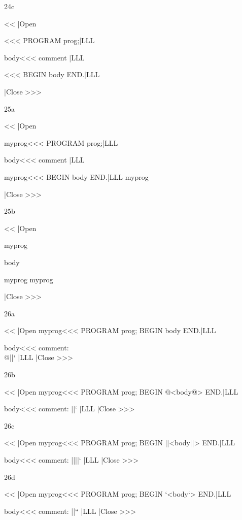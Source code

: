 {2{4c}

\<<<
|Open

\<\><<<
PROGRAM prog;|LLL

\<body\><<<
{ comment } |LLL

\<\><<<
BEGIN
  \<body\>
END.|LLL

\OutputCode\<\> 
|Close >>>  



2{5a}

\<<<
|Open

\<myprog\><<<
PROGRAM prog;|LLL

\<body\><<<
{ comment } |LLL

\<myprog\><<<
BEGIN
  \<body\>
END.|LLL
\OutputCode\<myprog\> 

|Close >>>

2{5b}

\<<<
|Open

\<myprog

\<body

\<myprog
\OutputCode\<myprog\>  

|Close >>>




2{6a}

\<<<
|Open
\<myprog\><<<
PROGRAM prog;
BEGIN
  \<body\>
END.|LLL  

\<body\><<<
{ comment: \\@||` } |LLL 
|Close >>> 

2{6b}

\<<<
|Open
\<myprog\><<<
PROGRAM prog;
BEGIN
  @<body@>
END.|LLL  

\<body\><<<
{ comment: \@@||` } |LLL 
|Close >>> 

2{6c}


\<<<
|Open
\<myprog\><<<
PROGRAM prog;
BEGIN
  ||<body||>
END.|LLL  

\<body\><<<
{ comment: \@||||` } |LLL 
|Close >>> 


2{6d}

\<<<
|Open
\<myprog\><<<
PROGRAM prog;
BEGIN
  `<body`>
END.|LLL  

\<body\><<<
{ comment: \@||`` } |LLL 
|Close >>> 

}
